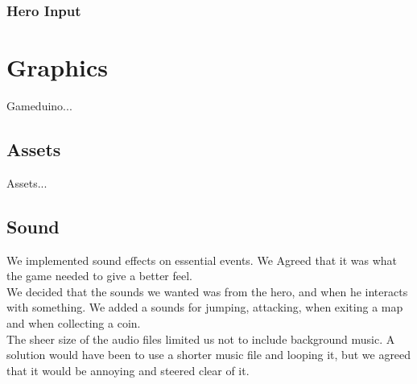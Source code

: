 \subsubsection{Hero Input}

\section{Graphics}
Gameduino...

\subsection{Assets}
Assets...

\subsection{Sound} %
We implemented sound effects on essential events. We Agreed that it was what the game needed to give a better feel.\\
We decided that the sounds we wanted was from the hero, and when he interacts with something. We added a sounds for jumping, attacking, when exiting a map and when collecting a coin.\\
 The sheer size of the audio files limited us not to include background music. A solution would have been to use a shorter music file and looping it, but we agreed that it would be annoying and steered clear of it.